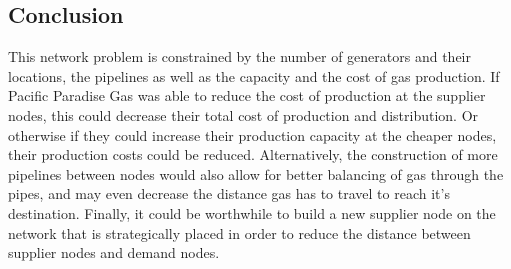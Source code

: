 \documentclass{article}
\begin{document}
\newpage
\subsection{Conclusion}
This network problem is constrained by the number of generators and their locations, the pipelines as well as the capacity and the cost of gas production. If Pacific Paradise Gas was able to reduce the cost of production at the supplier nodes, this could decrease their total cost of production and distribution. Or otherwise if they could increase their production capacity at the cheaper nodes, their production costs could be reduced. Alternatively, the construction of more pipelines between nodes would also allow for better balancing of gas through the pipes, and may even decrease the distance gas has to travel to reach it's destination. Finally, it could be worthwhile to build a new supplier node on the network that is strategically placed in order to reduce the distance between supplier nodes and demand nodes.



\bigskip
\color{black}
\end{document}
